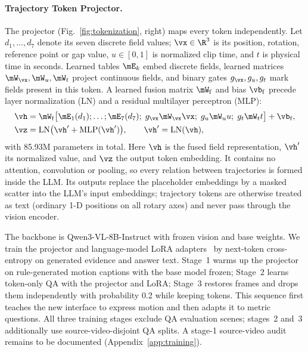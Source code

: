 \paragraph{Trajectory Token Projector.}
The projector (Fig.~\ref{fig:tokenization}, right) maps every token independently. Let $d_1,\ldots,d_7$ denote its seven discrete field values; $\vx\in\R^3$ is its position, rotation, reference point or gap value, $u\in[0,1]$ is normalized clip time, and $t$ is physical time in seconds. Learned tables $\mE_k$ embed discrete fields, learned matrices $\mW_{\vx},\mW_u,\mW_t$ project continuous fields, and binary gates $g_{\vx},g_u,g_t$ mark fields present in this token. A learned fusion matrix $\mW_{\mathrm f}$ and bias $\vb_{\mathrm f}$ precede layer normalization (LN) and a residual multilayer perceptron (MLP):
\begin{align}
\vh&=\mW_{\mathrm{f}}\big[\mE_1(d_1);\dots;\mE_7(d_7);\;g_{\vx}\mW_{\vx}\vx;\;g_u\mW_u u;\;g_t\mW_t t\big]+\vb_{\mathrm{f}},
\label{eq:projector}\\
\vz&=\mathrm{LN}\big(\vh'+\mathrm{MLP}(\vh')\big),\qquad \vh'=\mathrm{LN}(\vh),\nonumber
\end{align}
with 85.93M parameters in total.
Here $\vh$ is the fused field representation, $\vh'$ its normalized value, and $\vz$ the output token embedding.
It contains no attention, convolution or pooling, so every relation between trajectories is formed inside the LLM.
Its outputs replace the placeholder embeddings by a masked scatter into the LLM's input embeddings; trajectory tokens are otherwise treated as text (ordinary 1-D positions on all rotary axes) and never pass through the vision encoder.


The backbone is Qwen3-VL-8B-Instruct with frozen vision and base weights. We train the projector and language-model LoRA adapters~\citep{huLoRALowRankAdaptation2021} by next-token cross-entropy on generated evidence and answer text. Stage~1 warms up the projector on rule-generated motion captions with the base model frozen; Stage~2 learns token-only QA with the projector and LoRA; Stage~3 restores frames and drops them independently with probability 0.2 while keeping tokens. This sequence first teaches the new interface to express motion and then adapts it to metric questions. All three training stages exclude QA evaluation scenes; stages~2 and~3 additionally use source-video-disjoint QA splits. A stage-1 source-video audit remains to be documented (Appendix~\ref{app:training}).
